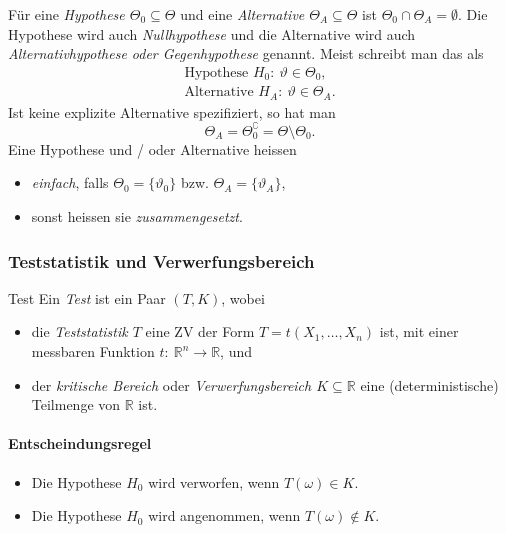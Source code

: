 \documentclass[a4paper,10pt]{article}
\def\R{\mathbb{R}}
\numberwithin{equation}{section}
\begin{document}
Für eine \emph{Hypothese \( \Theta_0 \subseteq \Theta \)} und eine \emph{Alternative \( \Theta_A \subseteq \Theta \)} ist \( \Theta_0 \cap \Theta_A = \emptyset \).
Die Hypothese wird auch \emph{Nullhypothese} und die Alternative wird auch \emph{Alternativhypothese oder Gegenhypothese} genannt.
Meist schreibt man das als
\begin{gather*}
    \text{Hypothese } H_0: \: \vartheta \in \Theta_0 \text{,} \\
    \text{Alternative } H_A: \: \vartheta \in \Theta_A \text{.}
\end{gather*}
Ist keine explizite Alternative spezifiziert, so hat man
\[
    \Theta_A = \Theta_0^\complement = \Theta \setminus \Theta_0 \text{.}
\]
Eine Hypothese und / oder Alternative heissen
\begin{itemize}
    \item \emph{einfach}, falls \( \Theta_0 = \{\vartheta_0\} \) bzw. \( \Theta_A = \{\vartheta_A\} \),
    \item sonst heissen sie \emph{zusammengesetzt}.
\end{itemize}


\subsubsection{Teststatistik und Verwerfungsbereich}

\begin{mainbox}{Test}
    Ein \emph{Test} ist ein Paar \( (T, K) \), wobei
    \begin{itemize}
        \item die \emph{Teststatistik \( T \)} eine ZV der Form \( T = t(X_1, \dots, X_n) \) ist, mit einer messbaren Funktion \( t: \: \R^n \to \R \), und
        \item der \emph{kritische Bereich} oder \emph{Verwerfungsbereich \( K \subseteq \R \)} eine (deterministische) Teilmenge von \( \R \) ist.
    \end{itemize}
\end{mainbox}

\paragraph{Entscheindungsregel}
\begin{itemize}
    \item Die Hypothese \( H_0 \) wird verworfen, wenn \( T(\omega) \in K \).
    \item Die Hypothese \( H_0 \) wird angenommen, wenn \( T(\omega) \notin K \).
\end{itemize}
\end{document}
